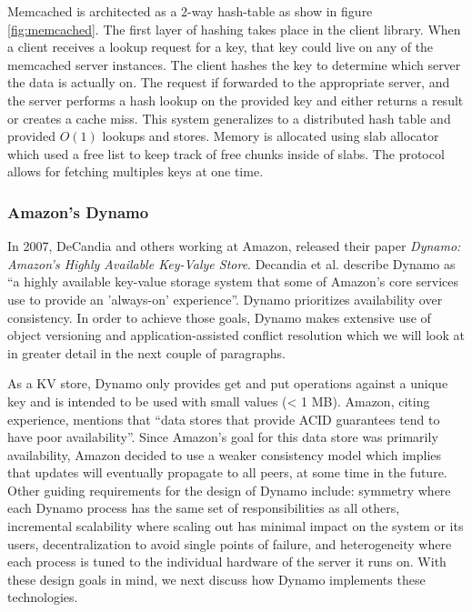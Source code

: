 \documentclass[]{article}
\begin{document}
Memcached is architected as a 2-way hash-table as show in figure \ref{fig:memcached}. The first layer of hashing takes place in the client library. When a client receives a lookup request for a key, that key could live on any of the memcached server instances. The client hashes the key to determine which server the data is actually on. The request if forwarded to the appropriate server, and the server performs a hash lookup on the provided key and either returns a result or creates a cache miss. This system generalizes to a distributed hash table and provided $O(1)$ lookups and stores. Memory is allocated using slab allocator which used a free list to keep track of free chunks inside of slabs. The protocol allows for fetching multiples keys at one time. 

\subsubsection{Amazon's Dynamo}
In 2007, DeCandia and others working at Amazon, released their paper \textit{Dynamo: Amazon's Highly Available Key-Valye Store}\cite{decandia_dynamo:_2007}. Decandia et al. describe Dynamo as ``a highly available key-value storage system that some of Amazon's core services use to provide an 'always-on' experience''. Dynamo prioritizes availability over consistency. In order to achieve those goals, Dynamo makes extensive use of object versioning and application-assisted conflict resolution which we will look at in greater detail in the next couple of paragraphs.

As a KV store, Dynamo only provides get and put operations against a unique key and is intended to be used with small values (< 1 MB). Amazon, citing experience, mentions that ``data stores that provide ACID guarantees tend to have poor availability''. Since Amazon's goal for this data store was primarily availability, Amazon decided to use a weaker consistency model which implies that updates will eventually propagate to all peers, at some time in the future. Other guiding requirements for the design of Dynamo include: symmetry where each Dynamo process has the same set of responsibilities as all others, incremental scalability where scaling out has minimal impact on the system or its users, decentralization to avoid single points of failure, and heterogeneity where each process is tuned to the individual hardware of the server it runs on. With these design goals in mind, we next discuss how Dynamo implements these technologies.
\end{document}
